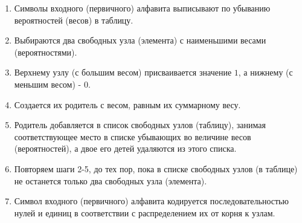\begin{enumerate}
  \item Символы входного (первичного) алфавита выписывают по убыванию вероятностей (весов) в таблицу.
  \item Выбираются два свободных узла (элемента) с наименьшими весами (вероятностями).
  \item Верхнему узлу (с большим весом) присваивается значение $1$, а нижнему (с меньшим весом) - $0$.
  \item Создается их родитель с весом, равным их суммарному весу.
  \item Родитель добавляется в список свободных узлов (таблицу), занимая соответствующее место в списке убывающих во величине весов (вероятностей), а двое его детей удаляются из этого списка.
  \item Повторяем шаги 2-5, до тех пор, пока в списке свободных узлов (в таблице) не останется только два свободных узла (элемента).
  \item Символ входного (первичного) алфавита кодируется последовательностью нулей и единиц в соответствии с распределением их от корня к узлам.
\end{enumerate}

